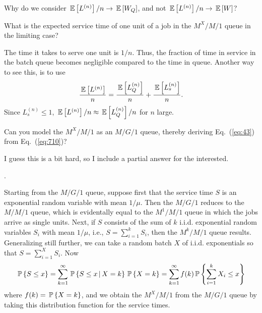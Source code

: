 \begin{question}
  Why do we consider $\E{L^{(n)}}/n \to \E{W_Q}$, and not
  $\E{L^{(n)}}/n \to \E W$? 
  \begin{hint} What is the expected service time of one
  unit of a job in the $M^X/M/1$ queue in the limiting case?
  \end{hint}
  \begin{solution}
    The time it takes to serve one unit is $1/n$. Thus, the fraction
    of time in service in the batch queue becomes negligible compared
    to the time in queue. Another way to see this, is to use 
    \begin{equation*}
      \frac{\E{L^{(n)}}}n = 
      \frac{\E{L^{(n)}_Q}}n + \frac{\E{L^{(n)}_s}}n.
    \end{equation*}
Since $L^{(n)}_s \leq 1$, $\E{L^{(n)}}/n \approx \E{L^{(n)}_Q}/n$ for $n$ large.
  \end{solution}
\end{question}

  
\begin{question}[use=false]
Can you model the $M^X/M/1$ as an $M/G/1$ queue, thereby deriving Eq.~(\ref{eq:43}) from Eq.~(\ref{eq:710})? 
  \begin{solution}
I guess this is a bit hard, so I include a partial answer for the interested. 

\TBD.

Starting from the $M/G/1$ queue, suppose first that the service time
$S$ is an exponential random variable with mean $1/\mu$.  Then the
$M/G/1$ reduces to the $M/M/1$ queue, which is evidentally equal to
the $M^1/M/1$ queue in which the jobs arrive as single units. Next, if
$S$ consists of the sum of $k$ i.i.d. exponential random variables
$S_i$ with mean $1/\mu$, i.e., $S=\sum_{i=1}^k S_i$, then the
$M^k/M/1$ queue results. Generalizing still further, we can take a
random batch $X$ of i.i.d. exponentials so that $S = \sum_{i=1}^X S_i$. Now
\begin{equation*}
  \P{S\leq x}
= \sum_{k=1}^\infty \P{S \leq x\given X=k}\P{X=k}
= \sum_{k=1}^\infty f(k) \P{\sum_{i=1}^k X_i \leq x}
\end{equation*}
where $f(k)=\P{X=k}$, and we obtain the $M^X/M/1$ from the $M/G/1$
queue by taking this distribution function for the service times.
  \end{solution}
\end{question}


